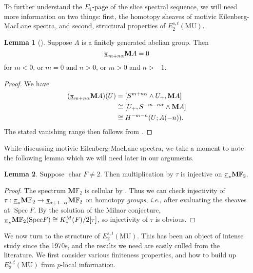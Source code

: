 \documentclass[10pt]{amsart}
\numberwithin{equation}{section}
\theoremstyle{plain}
\theoremstyle{definition}
\newtheorem{lemma}[lemma]{Lemma}
\theoremstyle{remark}
\begin{document}
To further understand the $E_1$-page of the slice spectral sequence, we will need more information on two things:  first, the homotopy sheaves of motivic Eilenberg-MacLane spectra, and second, structural properties of $E_2^{s,t}({\mathrm{MU}})$.

\begin{lemma}[{\cite[Corollary 3.2.1]{SV}}]\label{lemma:EM}
Suppose $A$ is a finitely generated abelian group.  Then
\[
  {\underline{\smash{\pi}}}_{m+n\alpha}{\mathbf{M}} A = 0
\]
for $m<0$, or $m=0$ and $n>0$, or $m>0$ and $n>-1$.
\end{lemma}
\begin{proof}
We have
\[
\begin{aligned}
  ({\underline{\smash{\pi}}}_{m+n\alpha} {\mathbf{M}} A)(U) &= [S^{m+n\alpha}\wedge U_+,{\mathbf{M}} A]\\
  &\cong [U_+,S^{-m-n\alpha}\wedge {\mathbf{M}} A]\\
  &\cong H^{-m-n}(U;A(-n)).
\end{aligned}
\]
The stated vanishing range then follows from \cite[Corollary 3.2.1]{SV}.
\end{proof}

While discussing motivic Eilenberg-MacLane spectra, we take a moment to note the following lemma which we will need later in our arguments.

\begin{lemma}\label{lemma:tau}
Suppose ${\operatorname{char}} F\ne 2$.  Then multiplication by $\tau$ is injective on ${\underline{\smash{\pi}}}_\star{\mathbf{M}}{\mathbb{F}}_2$.
\end{lemma}
\begin{proof}
The spectrum ${\mathbf{M}}{\mathbb{F}}_2$ is cellular by \cite[Proposition 8.1]{Hoyois}.
Thus we can check injectivity of  $\tau:{\underline{\smash{\pi}}}_\star{\mathbf{M}}{\mathbb{F}}_2\to {\underline{\smash{\pi}}}_{\star+1-\alpha}{\mathbf{M}}{\mathbb{F}}_2$ on homotopy \emph{groups}, \emph{i.e.,} after evaluating the sheaves at ${\operatorname{Spec}} F$.  
By the solution of the Milnor conjecture, ${\underline{\smash{\pi}}}_\star{\mathbf{M}}{\mathbb{F}}_2({\operatorname{Spec}} F)\cong K^M_*(F)/2[\tau]$, so injectivity of $\tau$ is obvious.
\end{proof}

We now turn to the structure of $E_2^{s,t}({\mathrm{MU}})$.  
This has been an object of intense study since the 1970s, and the results we need are easily culled from the literature.  
We first consider various finiteness properties, and how to build up $E_2^{s,t}({\mathrm{MU}})$ from $p$-local information.
\end{document}

